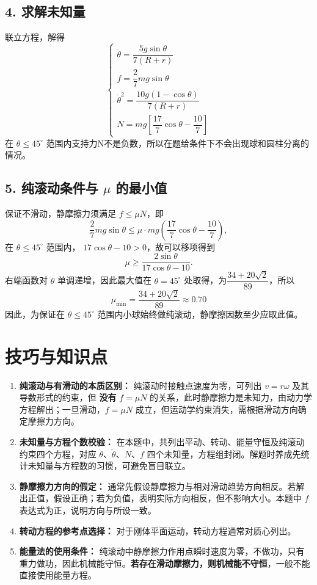 \documentclass[11pt,a4paper]{ctexart}
\begin{document}
\subsection*{4. 求解未知量}
联立方程，解得
\[
\begin{cases}
\ddot{\theta} = \dfrac{5g\sin\theta}{7(R+r)} \\[8pt]
f = \dfrac{2}{7}mg\sin\theta \\[8pt]
\dot{\theta}^2 = \dfrac{10g(1-\cos\theta)}{7(R+r)} \\[8pt]
N = mg\left[\dfrac{17}{7}\cos\theta - \dfrac{10}{7}\right]
\end{cases}
\]
在 $\theta \le 45^\circ$ 范围内支持力N不是负数，所以在题给条件下不会出现球和圆柱分离的情况。
\subsection*{5. 纯滚动条件与 $\mu$ 的最小值}
保证不滑动，静摩擦力须满足 $f \le \mu N$，即
\[
\frac{2}{7}mg\sin\theta \le \mu \cdot mg\left(\frac{17}{7}\cos\theta - \frac{10}{7}\right),
\]
在 $\theta \le 45^\circ$ 范围内， $17\cos\theta-10 >0$，故可以移项得到
\[
\mu \ge \frac{2\sin\theta}{17\cos\theta - 10}.
\]
右端函数对 $\theta$ 单调递增，因此最大值在 $\theta = 45^\circ$ 处取得，为$\dfrac{34+20\sqrt2}{89}$，所以
\[
\boxed{\mu_{\min} = \frac{34+20\sqrt{2}}{89} \approx 0.70}
\]
因此，为保证在 $\theta \le 45^\circ$ 范围内小球始终做纯滚动，静摩擦因数至少应取此值。

\section*{技巧与知识点}
\begin{tipBox}
\begin{enumerate}
  \item \textbf{纯滚动与有滑动的本质区别：}
  纯滚动时接触点速度为零，可列出 $v = r\omega$ 及其导数形式的约束，但 \textbf{没有} $f = \mu N$ 的关系，此时静摩擦力是未知力，由动力学方程解出；一旦滑动，$f = \mu N$ 成立，但运动学约束消失，需根据滑动方向确定摩擦力方向。
  \item \textbf{未知量与方程个数校验：}
  在本题中，共列出平动、转动、能量守恒及纯滚动约束四个方程，对应 $\dot{\theta}$、$\ddot{\theta}$、$N$、$f$ 四个未知量，方程组封闭。解题时养成先统计未知量与方程数的习惯，可避免盲目联立。
  \item \textbf{静摩擦力方向的假定：}
  通常先假设静摩擦力与相对滑动趋势方向相反。若解出正值，假设正确；若为负值，表明实际方向相反，但不影响大小。本题中 $f$ 表达式为正，说明方向与所设一致。
  \item \textbf{转动方程的参考点选择：}
  对于刚体平面运动，转动方程通常对质心列出。
  \item \textbf{能量法的使用条件：}
  纯滚动中静摩擦力作用点瞬时速度为零，不做功，只有重力做功，因此机械能守恒。\textbf{若存在滑动摩擦力，则机械能不守恒}，一般不能直接使用能量方程。
\end{enumerate}
\end{tipBox}
\end{document}
